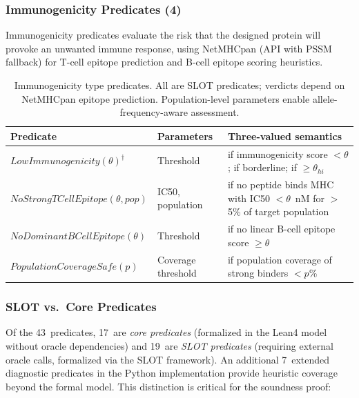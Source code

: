 \subsubsection{Immunogenicity Predicates (4)}

Immunogenicity predicates evaluate the risk that the designed protein
will provoke an unwanted immune response, using NetMHCpan (API with
PSSM fallback) for T-cell epitope prediction and B-cell epitope
scoring heuristics.

\begin{table}[t]
\centering
\caption{Immunogenicity type predicates. All are SLOT predicates;
         verdicts depend on NetMHCpan epitope prediction.
         Population-level parameters enable allele-frequency-aware
         assessment.}
\label{tab:imm-predicates}
\begin{tabular}{llp{4.6cm}}
\toprule
\textbf{Predicate} & \textbf{Parameters} & \textbf{Three-valued semantics} \\
\midrule
$\mathit{LowImmunogenicity}(\theta)^\dagger$ & Threshold &
  \PASS{} if immunogenicity score $< \theta$; \UNCERTAIN{} if
  borderline; \FAIL{} if $\ge \theta_{\mathit{hi}}$ \\
$\mathit{NoStrongTCellEpitope}(\theta,\mathit{pop})$ & IC50, population &
  \PASS{} if no peptide binds MHC with IC50 $< \theta$~nM for
  $>$5\% of target population \\
$\mathit{NoDominantBCellEpitope}(\theta)$ & Threshold &
  \PASS{} if no linear B-cell epitope score $\ge \theta$ \\
$\mathit{PopulationCoverageSafe}(p)$ & Coverage threshold &
  \PASS{} if population coverage of strong binders $< p$\% \\
\bottomrule
\end{tabular}
\end{table}

\subsubsection{SLOT vs.\ Core Predicates}

Of the 43~predicates, 17~are \emph{core predicates} (formalized in the
Lean4 model without oracle dependencies) and 19~are \emph{SLOT predicates}
(requiring external oracle calls, formalized via the SLOT framework).
An additional 7~extended diagnostic predicates in the Python
implementation provide heuristic coverage beyond the formal model.
This distinction is critical for the soundness proof:

